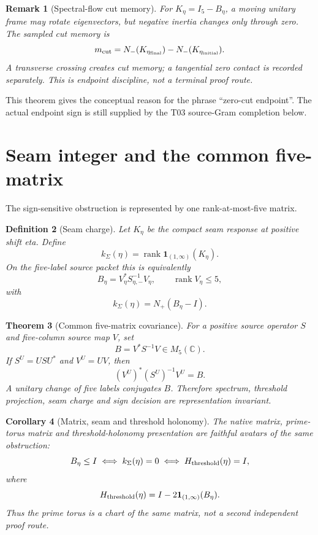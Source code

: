 \documentclass[11pt]{article}
\newtheorem{theorem}{Theorem}[section]
\newtheorem{corollary}[theorem]{Corollary}
\newtheorem{definition}[theorem]{Definition}
\newtheorem{remark}[theorem]{Remark}
\newcommand{\C}{\mathbb C}
\newcommand{\BSEta}{B_\eta}
\newcommand{\kSigma}{k_\Sigma}
\begin{document}
\begin{remark}[Spectral-flow cut memory]
For \(K_\eta=I_5-B_\eta\), a moving unitary frame may rotate eigenvectors, but negative inertia changes only through zero.  The sampled cut memory is
\[
m_{\rm cut}=N_-(K_{\eta_{\rm final}})-N_-(K_{\eta_{\rm initial}}).
\]
A transverse crossing creates cut memory; a tangential zero contact is recorded separately.  This is endpoint discipline, not a terminal proof route.
\end{remark}

This theorem gives the conceptual reason for the phrase ``zero-cut endpoint''.  The actual endpoint sign is still supplied by the T03 source-Gram completion below.

\section{Seam integer and the common five-matrix}

The sign-sensitive obstruction is represented by one rank-at-most-five matrix.

\begin{definition}[Seam charge]
Let \(K_\eta\) be the compact seam response at positive shift eta.  Define
\[
\kSigma(\eta)=\operatorname{rank}\mathbf 1_{(1,\infty)}(K_\eta).
\]
On the five-label source packet this is equivalently
\[
\BSEta=V_\eta^*S_{\eta,-}^{-1}V_\eta,\qquad \operatorname{rank}V_\eta\le5,
\]
with
\[
\kSigma(\eta)=N_+(\BSEta-I).
\]
\end{definition}

\begin{theorem}[Common five-matrix covariance]
For a positive source operator \(S\) and five-column source map \(V\), set
\[
B=V^*S^{-1}V\in M_5(\C).
\]
If \(S^U=USU^*\) and \(V^U=UV\), then
\[
(V^U)^*(S^U)^{-1}V^U=B.
\]
A unitary change of five labels conjugates \(B\).  Therefore spectrum, threshold projection, seam charge and sign decision are representation invariant.
\end{theorem}

\begin{corollary}[Matrix, seam and threshold holonomy]
The native matrix, prime-torus matrix and threshold-holonomy presentation are faithful avatars of the same obstruction:
\[
\BSEta\le I
\iff
\kSigma(\eta)=0
\iff
H_{\rm threshold}(\eta)=I,
\]
where
\[
H_{\rm threshold}(\eta)=I-2\mathbf 1_{(1,\infty)}(\BSEta).
\]
Thus the prime torus is a chart of the same matrix, not a second independent proof route.
\end{corollary}
\end{document}
